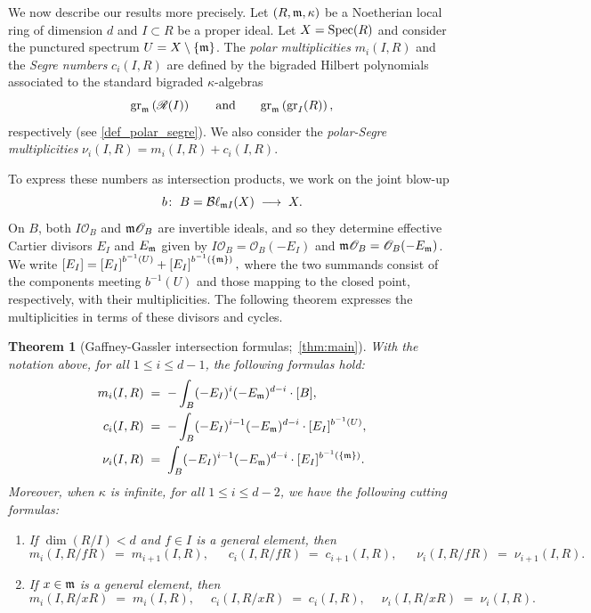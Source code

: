\documentclass[a4paper, 11pt]{amsart}
\newcommand{\Bl}{{\mathcal{B}\ell}}
\newcommand{\mm}{{\normalfont\mathfrak{m}}}
\newcommand{\Rees}{\mathscr{R}}
\newcommand{\OO}{\mathscr{O}}
\newcommand{\gr}{{\normalfont\text{gr}}}
\newcommand{\Spec}{\normalfont\text{Spec}}
\newtheorem{headthm}{Theorem}
\theoremstyle{definition}
\begin{document}
	\smallskip
	
	We now describe our results more precisely. 
	Let $(R,\mm,\kappa)$ be a Noetherian local ring of dimension $d$ and $I\subset R$ be a proper ideal.
	Let $X = \Spec(R)$ and consider the punctured spectrum $U = X \setminus \{\mm\}$.
	The \emph{polar multiplicities} $m_i(I,R)$ and the \emph{Segre numbers} $c_i(I,R)$ are defined by the bigraded Hilbert polynomials associated to the standard bigraded $\kappa$-algebras
	$$
	\gr_\mm\left(\Rees(I)\right)
	\qquad\text{and}\qquad
	\gr_\mm\left(\gr_I(R)\right),
	$$
	respectively (see \autoref{def_polar_segre}). 
	We also consider the \emph{polar-Segre multiplicities} $\nu_i(I,R)=m_i(I,R)+c_i(I,R)$.
	
	To express these numbers as intersection products, we work on the joint
	blow-up
	$$
	b\colon \; B=\Bl_{\mm I}(X) \;\longrightarrow\; X.
	$$
	On $B$, both $I\OO_B$ and $\mm\OO_B$ are invertible ideals, and so they determine effective Cartier divisors $E_I$ and $E_\mm$ given by $I\OO_B=\OO_B(-E_I)$ and $\mm\OO_B=\OO_B(-E_\mm)$.
	We write
	$
	\left[E_I\right] =  \left[E_I\right]^{b^{-1}(U)}+\left[E_I\right]^{b^{-1}(\{\mm\})},
	$
	where the two summands consist of the components meeting $b^{-1}(U)$
	and those mapping to the closed point, respectively, with their multiplicities.
	The following theorem expresses the multiplicities in terms of these
	divisors and cycles.
	
	\begin{headthm}[{Gaffney-Gassler intersection formulas;~\autoref{thm:main}}]
		\label{head:intersection-formulas}
		With the notation above, for all $1 \le i \le d-1$, the following formulas hold:
		\begin{align*}
			m_i(I,R)&\;=\;-\int_B (-E_I)^i(-E_\mm)^{d-i}\cdot[B],\\
			c_i(I,R)&\;=\;-\int_B (-E_I)^{i-1}(-E_\mm)^{d-i}\cdot[E_I]^{b^{-1}(U)},\\
			\nu_i(I,R)&\;=\;\int_B (-E_I)^{i-1}(-E_\mm)^{d-i}\cdot[E_I]^{b^{-1}(\{\mm\})}.
		\end{align*}
		Moreover, when $\kappa$ is infinite, for all $1 \le i \le d-2$, we have the following cutting formulas: 
		\begin{enumerate}[\rm (i)]
			\item If $\dim(R/I) < d$ and $f \in I$ is a general element, then 
			$$
			m_i(I,R/fR) \;=\; m_{i+1}(I,R), \quad\;\;
			c_i(I,R/fR) \;=\; c_{i+1}(I,R), \quad\;\;
			\nu_i(I,R/fR) \;=\; \nu_{i+1}(I,R).
			$$
			\item If $x \in \mm$ is a general element, then 
			$$
			m_i(I,R/xR) \;=\; m_{i}(I,R), \quad\; c_i(I,R/xR) \;=\; c_{i}(I,R), \quad\; \nu_i(I,R/xR) \;=\; \nu_{i}(I,R).
			$$
		\end{enumerate}
	\end{headthm}
	
\end{document}
